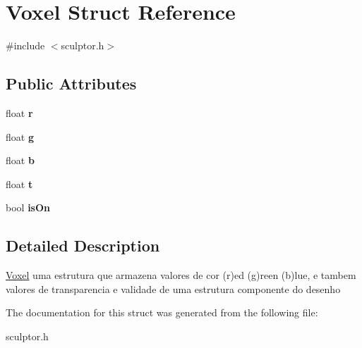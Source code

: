 \hypertarget{struct_voxel}{}\section{Voxel Struct Reference}
\label{struct_voxel}


{\ttfamily \#include $<$sculptor.\+h$>$}

\subsection*{Public Attributes}
\begin{DoxyCompactItemize}
\item 
\mbox{\label{struct_voxel_a06872ec79b836120b551a848968c0f1b}} 
float {\bfseries r}
\item 
\mbox{\label{struct_voxel_a27c0da1ed2ff430401d23ff171612a73}} 
float {\bfseries g}
\item 
\mbox{\label{struct_voxel_a5cd8432b1d7d0fd8b79e0fc7d10373a8}} 
float {\bfseries b}
\item 
\mbox{\label{struct_voxel_adc82a7a5bdf771ec6602340afbbedb6e}} 
float {\bfseries t}
\item 
\mbox{\label{struct_voxel_a6fbe8bd53f64685ac4210726d40fc775}} 
bool {\bfseries is\+On}
\end{DoxyCompactItemize}


\subsection{Detailed Description}
\mbox{\hyperlink{struct_voxel}{Voxel}} uma estrutura que armazena valores de cor (r)ed (g)reen (b)lue, e tambem valores de transparencia e validade de uma estrutura componente do desenho 

The documentation for this struct was generated from the following file\+:\begin{DoxyCompactItemize}
\item 
sculptor.\+h\end{DoxyCompactItemize}
